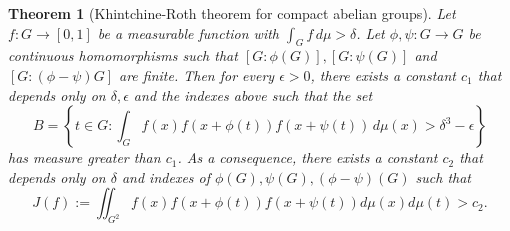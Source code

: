 \documentclass[10pt]{article}
\newtheorem*{theorem*}{Theorem}
\theoremstyle{definition}
\begin{document}
\begin{theorem*}[Khintchine-Roth theorem for compact abelian groups]  
Let $f: G \to [0, 1]$ be a measurable function with $\int_G f \, d \mu > \delta$. Let $\phi, \psi: G \to G$ be continuous homomorphisms such that $[G: \phi(G)], [G: \psi(G)]$ and $[G:(\phi-\psi)G]$ are finite. Then for every $\epsilon > 0$, there exists a constant $c_1$ that depends only on $\delta, \epsilon$ and the indexes above such that the set
\[
    B = \left\{t \in G: \int_G f(x) f(x+ \phi(t)) f(x + \psi(t)) \, d\mu(x) > \delta^3 - \epsilon \right\}
\]
has measure greater than $c_1$. As a consequence, there exists a constant $c_2$ that depends only on $\delta$ and indexes of $\phi(G), \psi(G), (\phi - \psi)(G)$ such that
\[
    J(f) := \iint_{G^2} f(x) f(x+ \phi(t)) f(x+ \psi(t)) d\mu(x) d\mu(t) > c_2.
\]
\end{theorem*}
\end{document}
